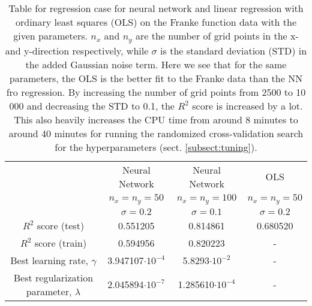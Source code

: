 \documentclass[12pt,a4paper,english]{article}
\begin{document}
\begin{table}[htbp!]
	\centering
	\begin{tabular}{ |c|c|c|c| }
		\hline \rule{0pt}{13pt}
		& Neural Network  & Neural Network  & OLS  \\
		& $n_x=n_y=50$ & $n_x=n_y=100$ & $n_x=n_y=50$ \\
		& $\sigma=0.2$ & $\sigma=0.1$ & $\sigma=0.2$ \\
		\hline \rule{0pt}{13pt}
		$R^2$ score (test) & 0.551205 & 0.814861 & 0.680520 \\
		\hline \rule{0pt}{13pt}
		$R^2$ score (train) & 0.594956 & 0.820223 & - \\
		\hline \rule{0pt}{13pt}
		Best learning rate, $\gamma$ & 3.947107$\cdot10^{-4}$ & 5.8293$\cdot10^{-2}$ & - \\
		\hline \rule{0pt}{13pt}
		Best regularization parameter, $\lambda$ & 2.045894$\cdot10^{-7}$ & 1.285610$\cdot10^{-4}$ & - \\
		\hline
	\end{tabular}	
	\caption{Table for regression case for neural network and linear regression with ordinary least squares (OLS) on the Franke function data with the given parameters. $n_x$ and $n_y$ are the number of grid points in the x- and y-direction respectively, while $\sigma$ is the standard deviation (STD) in the added Gaussian noise term. Here we see that for the same parameters, the OLS is the better fit to the Franke data than the NN fro regression. By increasing the number of grid points from 2500 to 10 000 and decreasing the STD to 0.1, the $R^2$ score is increased by a lot. This also heavily increases the CPU time from around 8 minutes to around 40 minutes for running the randomized cross-validation search for the hyperparameters (sect. \ref{subsect:tuning}).}
	\label{tab:reg}
\end{table}

\newpage
\end{document}

